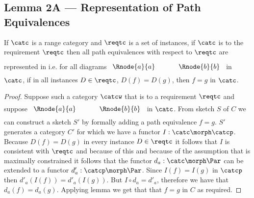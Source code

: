 
\subsection{Lemma 2A --- Representation of Path Equivalences}

\begin{lemma}
If $\catc$ is a range category and $\reqtc$ is a set of instances, 
if $\catc$ is 
 to the requirement $\reqtc$ then all path equivalences with respect
to $\reqtc$ are represented in \catcw
i.e. for all diagrams
$
\rule[-0.3cm]{0pt}{0.9cm} %
\begin{array}{c p{0.5cm} c  }
 \Rnode{a}{a}            &&   \Rnode{b}{b}
\end{array} 
$
in $\catc$,  if in all instances $D \in \reqtc$, $D(f)=D(g)$, 
then $f=g$ in $\catc$.
\end{lemma}
\begin{proof}
Suppose such a category  $\catcw$  that  is 
 to a requirement $\reqtc$
and suppose 
$
\rule[-0.3cm]{0pt}{0.8cm} %
\begin{array}{c p{0.5cm} c  }
 \Rnode{a}{a}            &&   \Rnode{b}{b}
\end{array} 
$
in $\catc$. From sketch $S$ of $C$ we can construct a sketch $S'$ by formally adding a path equivalence $f=g$.
$S'$ generates a category $C'$ for which we have a functor $I: \catc \morph \catcp$. 
Because $D(f) = D(g)$ in every instance $D \in \reqtc$
it follows that $I$ is consistent with $\reqtc$ and because 
of this and because of the assumption that \catcw is maximally constrained it follows that the functor $d_a: \catc \morph \Par$ 
can be extended to a functor $d'_a: \catcp \morph \Par$. 
Since $I(f)=I(g)$ in $\catcp$ then $d'_a(I(f))=d'_a(I(g))$. 
But $I \circ d_a = d'_a$, therefore we have that $d_a(f)=d_a(g)$. 
Applying lemma   we get that that $f=g$ in $C$ as required.
\end{proof}